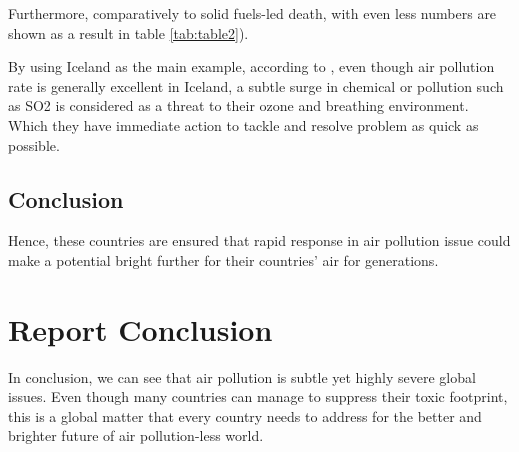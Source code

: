 \documentclass[11pt,a4paper,]{article}
\begin{document}
Furthermore, comparatively to solid fuels-led death, with even less numbers are shown as a result in table \ref{tab:table2}).

By using Iceland as the main example, according to \textcite{barsotti2020probabilistic}, even though air pollution rate is generally excellent in Iceland, a subtle surge in chemical or pollution such as SO2 is considered as a threat to their ozone and breathing environment. Which they have immediate action to tackle and resolve problem as quick as possible.

\hypertarget{conclusion-2}{%
\subsection{Conclusion}\label{conclusion-2}}

Hence, these countries are ensured that rapid response in air pollution issue could make a potential bright further for their countries' air for generations.

\hypertarget{report-conclusion}{%
\section{Report Conclusion}\label{report-conclusion}}

In conclusion, we can see that air pollution is subtle yet highly severe global issues. Even though many countries can manage to suppress their toxic footprint, this is a global matter that every country needs to address for the better and brighter future of air pollution-less world.

\printbibliography
\end{document}
